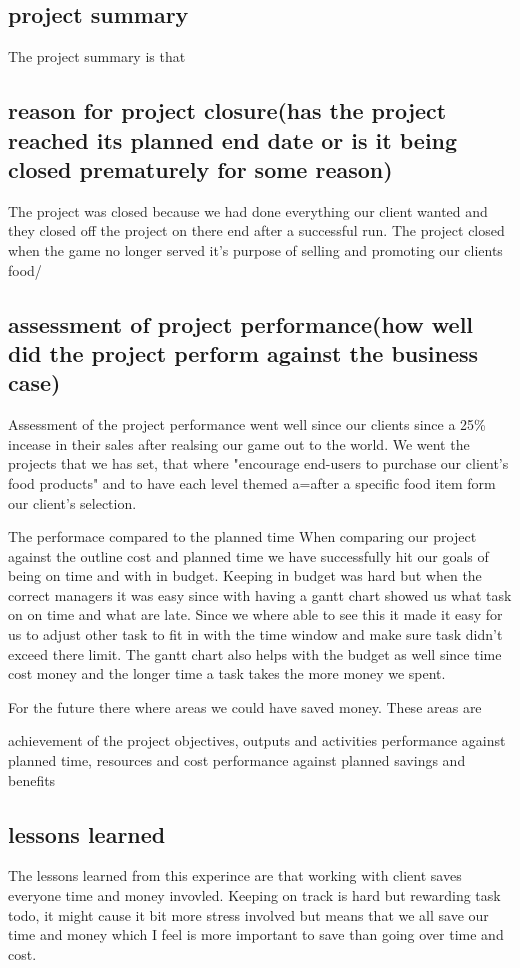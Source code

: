 \documentclass{article}
\begin{document}
\subsection{project summary}
The project summary is that 


\subsection{reason for project closure(has the project reached its planned end date or is it being closed prematurely for some reason)}
The project was closed because we had done everything our client wanted and they closed off the project on there end after a successful run. The project closed when the game no longer served it's purpose of selling and promoting our clients food/


\subsection{assessment of project performance(how well did the project perform against the business case)}
Assessment of the project performance went well since our clients since a 25\% incease in their sales after realsing our game out to the world. We went the projects that we has set, that where "encourage end-users to purchase our client's food products" and to have each level themed a=after a specific food item form our client's selection. 

The performace compared to the planned time 
When comparing our project against the outline cost and planned time we have successfully hit our goals of being on time and with in budget. Keeping in budget was hard but when the correct managers it was easy since with having a gantt chart showed us what task on on time and what are late. Since we where able to see this it made it easy for us to adjust other task to fit in with the time window and make sure task didn't exceed there limit. The gantt chart also helps with the budget as well since time cost money and the longer time a task takes the more money we spent.

For the future there where areas we could have saved money. These areas are

	achievement of the project objectives, outputs and activities
	performance against planned time, resources and cost
	performance against planned savings and benefits

\subsection{lessons learned}
The lessons learned from this experince are that working with client saves everyone time and money invovled. Keeping on track is hard but rewarding task todo, it might cause it bit more stress involved but means that we all save our time and money which I feel is more important to save than going over time and cost.
\end{document}
